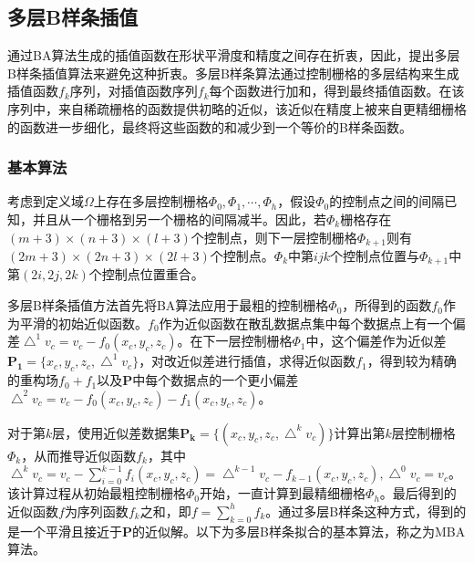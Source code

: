 \subsection{多层B样条插值}
通过BA算法生成的插值函数在形状平滑度和精度之间存在折衷，因此，提出多层B样条插值算法来避免这种折衷。多层B样条算法通过控制栅格的多层结构来生成插值函数$ f_{k} $序列，对插值函数序列$ f_{k} $每个函数进行加和，得到最终插值函数。在该序列中，来自稀疏栅格的函数提供初略的近似，该近似在精度上被来自更精细栅格的函数进一步细化，最终将这些函数的和减少到一个等价的B样条函数。

\subsubsection{基本算法}
考虑到定义域$ \Omega $上存在多层控制栅格$ \Phi_{0},\Phi_{1},\cdots,\Phi_{h} $，假设$ \Phi_{0} $的控制点之间的间隔已知，并且从一个栅格到另一个栅格的间隔减半。因此，若$ \Phi_{k} $栅格存在$ \left( m+3 \right) \times \left( n+3 \right) \times \left( l+3 \right) $个控制点，则下一层控制栅格$ \Phi_{k+1} $则有$ \left( 2m+3 \right) \times \left( 2n+3 \right) \times \left( 2l+3 \right) $个控制点。$ \Phi_{k} $中第$ ijk $个控制点位置与$ \Phi_{k+1} $中第$ \left( 2i,2j,2k \right) $个控制点位置重合。

多层B样条插值方法首先将BA算法应用于最粗的控制栅格$ \Phi_{0} $，所得到的函数$ f_{0} $作为平滑的初始近似函数。$ f_{0} $作为近似函数在散乱数据点集中每个数据点上有一个偏差$ \bigtriangleup^{1}v_{c} = v_{c} - f_{0}\left( x_{c}, y_{c}, z_{c} \right) $。在下一层控制栅格$ \Phi_{1} $中，这个偏差作为近似差$ \mathbf{P_{1}} = \{ x_{c}, y_{c}, z_{c}, \bigtriangleup^{1}v_{c} \} $，对改近似差进行插值，求得近似函数$ f_{1} $，得到较为精确的重构场$ f_{0}+f_{1} $以及$ \mathbf{P} $中每个数据点的一个更小偏差$ \bigtriangleup^{2}v_{c} = v_{c} - f_{0}\left( x_{c}, y_{c}, z_{c} \right) - f_{1}\left( x_{c}, y_{c}, z_{c} \right) $。

对于第$ k $层，使用近似差数据集$ \mathbf{P_{k}} = \{ \left( x_{c}, y_{c}, z_{c}, \bigtriangleup^{k}v_{c} \right) \} $计算出第$ k $层控制栅格$ \Phi_{k} $，从而推导近似函数$ f_{k} $，其中$ \bigtriangleup^{k}v_{c} = v_{c} - \sum_{i=0}^{k-1}f_{i}\left( x_{c}, y_{c}, z_{c} \right) = \bigtriangleup^{k-1}v_{c} - f_{k-1}\left( x_{c}, y_{c}, z_{c} \right) , \bigtriangleup^{0}v_{c} = v_{c} $。该计算过程从初始最粗控制栅格$ \Phi_{0} $开始，一直计算到最精细栅格$ \Phi_{h} $。最后得到的近似函数$ f $为序列函数$ f_{k} $之和，即$ f = \sum_{k=0}^{h} f_{k} $。通过多层B样条这种方式，得到的是一个平滑且接近于$ \mathbf{P} $的近似解。以下为多层B样条拟合的基本算法，称之为MBA算法。


